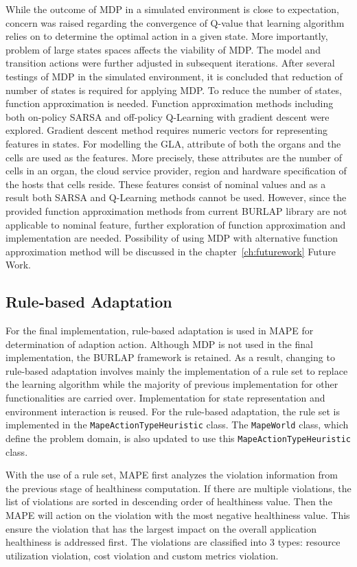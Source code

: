 \documentclass{seal_thesis}
\begin{document}
While the outcome of MDP in a simulated environment is close to expectation, concern was raised regarding the convergence of Q-value that learning algorithm relies on to determine the optimal action in a given state.
More importantly, problem of large states spaces affects the viability of MDP.
The model and transition actions were further adjusted in subsequent iterations.
After several testings of MDP in the simulated environment, it is concluded that reduction of number of states is required for applying MDP.
To reduce the number of states, function approximation is needed.
Function approximation methods including both on-policy SARSA and off-policy Q-Learning with gradient descent were explored.
Gradient descent method requires numeric vectors for representing features in states.
For modelling the GLA, attribute of both the organs and the cells are used as the features.
More precisely, these attributes are the number of cells in an organ, the cloud service provider, region and hardware specification of the hosts that cells reside.
These features consist of nominal values and as a result both SARSA and Q-Learning methods cannot be used.
However, since the provided function approximation methods from current BURLAP library are not applicable to nominal feature, further exploration of function approximation and implementation are needed.
Possibility of using MDP with alternative function approximation method will be discussed in the chapter~\ref{ch:futurework} Future Work.

\subsection{Rule-based Adaptation} \label{RBAdaptationLogic}
For the final implementation, rule-based adaptation is used in MAPE for determination of adaption action. 
Although MDP is not used in the final implementation, the BURLAP framework is retained.
As a result, changing to rule-based adaptation involves mainly the implementation of a rule set to replace the learning algorithm while the majority of previous implementation for other functionalities are carried over.
Implementation for state representation and environment interaction is reused.
For the rule-based adaptation, the rule set is implemented in the \texttt{MapeActionTypeHeuristic} class.
The \texttt{MapeWorld} class, which define the problem domain, is also updated to use this \texttt{MapeActionTypeHeuristic} class.

With the use of a rule set, MAPE first analyzes the violation information from the previous stage of healthiness computation.
If there are multiple violations, the list of violations are sorted in descending order of healthiness value.
Then the MAPE will action on the violation with the most negative healthiness value.
This ensure the violation that has the largest impact on the overall application healthiness is addressed first.
The violations are classified into 3 types: resource utilization violation, cost violation and custom metrics violation.
\end{document}
